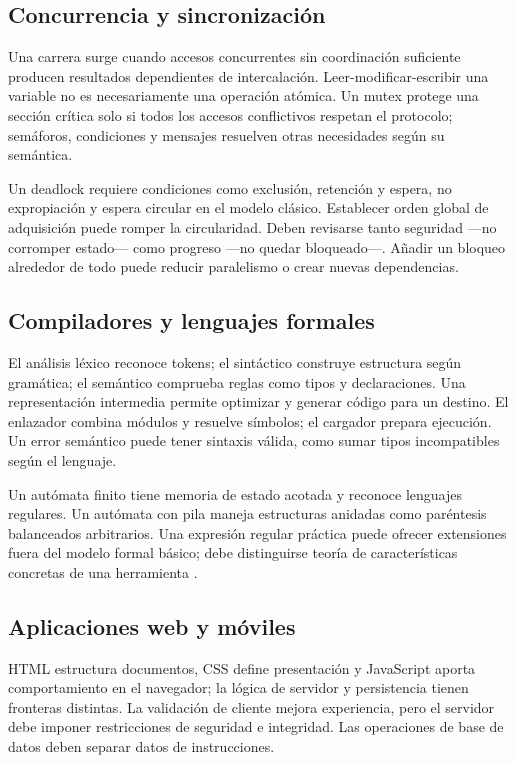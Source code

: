\subsection{Concurrencia y sincronización}
Una carrera surge cuando accesos concurrentes sin coordinación suficiente producen resultados dependientes de intercalación. Leer-modificar-escribir una variable no es necesariamente una operación atómica. Un mutex protege una sección crítica solo si todos los accesos conflictivos respetan el protocolo; semáforos, condiciones y mensajes resuelven otras necesidades según su semántica.

Un deadlock requiere condiciones como exclusión, retención y espera, no expropiación y espera circular en el modelo clásico. Establecer orden global de adquisición puede romper la circularidad. Deben revisarse tanto seguridad —no corromper estado— como progreso —no quedar bloqueado—. Añadir un bloqueo alrededor de todo puede reducir paralelismo o crear nuevas dependencias.

\subsection{Compiladores y lenguajes formales}
El análisis léxico reconoce tokens; el sintáctico construye estructura según gramática; el semántico comprueba reglas como tipos y declaraciones. Una representación intermedia permite optimizar y generar código para un destino. El enlazador combina módulos y resuelve símbolos; el cargador prepara ejecución. Un error semántico puede tener sintaxis válida, como sumar tipos incompatibles según el lenguaje.

Un autómata finito tiene memoria de estado acotada y reconoce lenguajes regulares. Un autómata con pila maneja estructuras anidadas como paréntesis balanceados arbitrarios. Una expresión regular práctica puede ofrecer extensiones fuera del modelo formal básico; debe distinguirse teoría de características concretas de una herramienta \cite[proyectos 10--11]{compiler}.

\subsection{Aplicaciones web y móviles}
HTML estructura documentos, CSS define presentación y JavaScript aporta comportamiento en el navegador; la lógica de servidor y persistencia tienen fronteras distintas. La validación de cliente mejora experiencia, pero el servidor debe imponer restricciones de seguridad e integridad. Las operaciones de base de datos deben separar datos de instrucciones.

